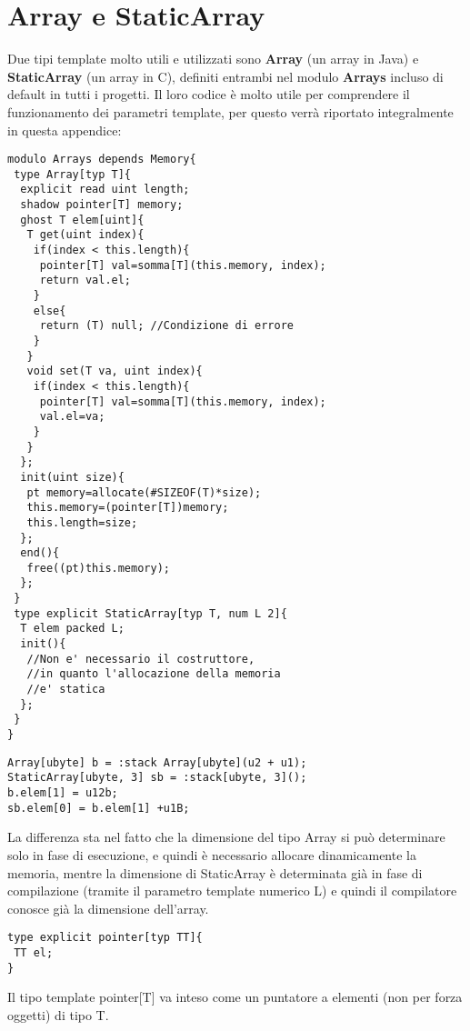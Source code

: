 \documentclass[10pt]{book}%
\newcommand{\e}{\`{e} }
\newcommand{\ac}[1]{\`{#1}}
\renewcommand{\emph}[1]{\textbf{#1}}
\newenvironment{codeenv}{
\begin{mdframed}[backgroundcolor=black!20,topline=false,leftline=false,rightline=false,bottomline=false]
}
{\end{mdframed}}
\begin{document}
\chapter{Array e StaticArray}
Due tipi template molto utili e utilizzati sono \emph{Array} (un array in Java) e \emph{StaticArray} (un array in C), definiti entrambi nel modulo \emph{Arrays} incluso di default in tutti i progetti. Il loro codice \e molto utile per comprendere il funzionamento dei parametri template, per questo verr\ac a riportato integralmente in questa appendice:
\begin{codeenv}
\begin{verbatim}
modulo Arrays depends Memory{
 type Array[typ T]{
  explicit read uint length;
  shadow pointer[T] memory;
  ghost T elem[uint]{
   T get(uint index){
    if(index < this.length){
     pointer[T] val=somma[T](this.memory, index);
     return val.el;
    }
    else{
     return (T) null; //Condizione di errore
    }
   }
   void set(T va, uint index){
    if(index < this.length){
     pointer[T] val=somma[T](this.memory, index);
     val.el=va;
    }
   }
  };
  init(uint size){
   pt memory=allocate(#SIZEOF(T)*size);
   this.memory=(pointer[T])memory;
   this.length=size;
  };
  end(){
   free((pt)this.memory);
  };
 }
 type explicit StaticArray[typ T, num L 2]{
  T elem packed L;
  init(){
   //Non e' necessario il costruttore,
   //in quanto l'allocazione della memoria
   //e' statica
  };
 }
}
\end{verbatim}
\end{codeenv}
\begin{codeenv}
\begin{verbatim}
Array[ubyte] b = :stack Array[ubyte](u2 + u1);
StaticArray[ubyte, 3] sb = :stack[ubyte, 3]();
b.elem[1] = u12b;
sb.elem[0] = b.elem[1] +u1B; 
\end{verbatim}
\end{codeenv}
La differenza sta nel fatto che la dimensione del tipo Array si pu\ac o determinare solo in fase di esecuzione, e quindi \e necessario allocare dinamicamente la memoria, mentre la dimensione di StaticArray \e determinata gi\ac a in fase di compilazione (tramite il parametro template numerico L) e quindi il compilatore conosce gi\ac a la dimensione dell'array.

\begin{codeenv}
\begin{verbatim}
type explicit pointer[typ TT]{
 TT el;
}
\end{verbatim}
\end{codeenv}
Il tipo template pointer[T] va inteso come un puntatore a elementi (non per forza oggetti) di tipo T.
\end{document}
